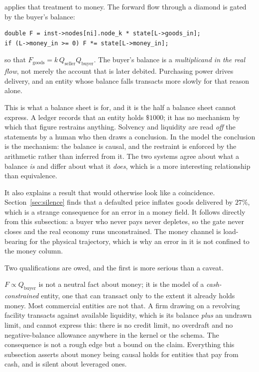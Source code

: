 \documentclass[11pt,a4paper]{article}
\begin{document}
\gssk{} applies that treatment to money. The forward flow through a diamond is gated by the buyer's balance:
\begin{lstlisting}[style=c]
double F = inst->nodes[ni].node_k * state[L->goods_in];
if (L->money_in >= 0) F *= state[L->money_in];
\end{lstlisting}
so that $F_{\text{goods}} = k\,Q_{\text{seller}}Q_{\text{buyer}}$. The buyer's balance is a \emph{multiplicand in the real flow}, not merely the account that is later debited. Purchasing power drives delivery, and an entity whose balance falls transacts more slowly for that reason alone.

This is what a balance sheet is for, and it is the half a balance sheet cannot express. A ledger records that an entity holds $\$1000$; it has no mechanism by which that figure restrains anything. Solvency and liquidity are read \emph{off} the statements by a human who then draws a conclusion. In the model the conclusion is the mechanism: the balance is causal, and the restraint is enforced by the arithmetic rather than inferred from it. The two systems agree about what a balance \emph{is} and differ about what it \emph{does}, which is a more interesting relationship than equivalence.

It also explains a result that would otherwise look like a coincidence. Section~\ref{sec:silence} finds that a defaulted price inflates goods delivered by $27\%$, which is a strange consequence for an error in a money field. It follows directly from this subsection: a buyer who never pays never depletes, so the gate never closes and the real economy runs unconstrained. The money channel is load-bearing for the physical trajectory, which is why an error in it is not confined to the money column.

Two qualifications are owed, and the first is more serious than a caveat.

$F \propto Q_{\text{buyer}}$ is not a neutral fact about money; it is the model of a \emph{cash-constrained} entity, one that can transact only to the extent it already holds money. Most commercial entities are not that. A firm drawing on a revolving facility transacts against available liquidity, which is its balance \emph{plus} an undrawn limit, and \gssk{} cannot express this: there is no credit limit, no overdraft and no negative-balance allowance anywhere in the kernel or the schema. The consequence is not a rough edge but a bound on the claim. Everything this subsection asserts about money being causal holds for entities that pay from cash, and is silent about leveraged ones.
\end{document}
